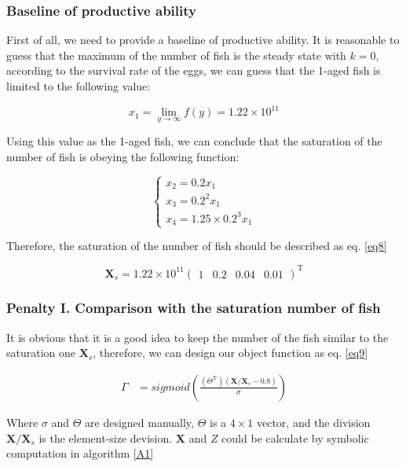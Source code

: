 \documentclass{IEEEtran}
\begin{document}
\subsubsection{Baseline of productive ability}

First of all, we need to provide a baseline of productive ability. It is reasonable to guess that the maximum of the number of fish is the steady state with $k = 0$, according to the survival rate of the eggs, we can guess that the 1-aged fish is limited to the following value:

\begin{equation}
    x_1 = \lim_{y\to\infty} f(y) = 1.22 \times 10^{11}
\end{equation}

Using this value as the 1-aged fish, we can conclude that the saturation of the number of fish is obeying the following function:

\begin{equation}
    \begin{cases}
        x_2 = 0.2 x_1\\
        x_3 = 0.2^2 x_1\\
        x_4 = 1.25 \times 0.2^3 x_1
    \end{cases}
\end{equation}

Therefore, the saturation of the number of fish should be described as eq. \ref{eq8}

\begin{equation}
    \label{eq8}
    \bm X_s = 1.22 \times 10^{11}\begin{pmatrix}1 & 0.2 & 0.04 & 0.01\end{pmatrix}^\mathrm T
\end{equation}

\subsubsection{Penalty I. Comparison with the saturation number of fish}

It is obvious that it is a good idea to keep the number of the fish similar to the saturation one $\bm X_s$, therefore, we can design our object function as eq. \ref{eq9}

\begin{align}
    \label{eq9}
    \Gamma &= sigmoid(\frac{(\Theta^\mathrm T)(\bm X / \bm X_s - 0.8)}{\sigma})
\end{align}

Where $\sigma$ and $\Theta$ are designed manually, $\Theta$ is a $4 \times 1$ vector, and the division $\bm X / \bm X_s$ is the element-size devision. $\bm X$ and $Z$ could be calculate by symbolic computation in algorithm \ref{A1}
\end{document}
